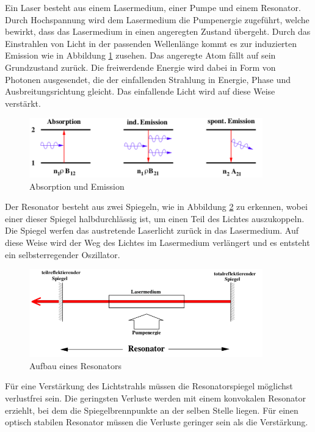 Ein Laser besteht aus einem Lasermedium, einer Pumpe und einem Resonator.
Durch Hochspannung wird dem Lasermedium die Pumpenergie zugeführt, welche bewirkt, dass das Lasermedium in einen angeregten Zustand übergeht.
Durch das Einstrahlen von Licht in der passenden Wellenlänge kommt es zur induzierten Emission wie in Abbildung \ref{fig:absemi} zusehen.
Das angeregte Atom fällt auf sein Grundzustand zurück.
Die freiwerdende Energie wird dabei in Form von Photonen ausgesendet, die der einfallenden Strahlung in Energie, Phase und Ausbreitungsrichtung gleicht.
Das einfallende Licht wird auf diese Weise verstärkt.\\
\begin{figure}[h!]
  \centering
  \includegraphics[width=0.9\textwidth]{absorption.PNG}
  \caption{Absorption und Emission}
  \label{fig:absemi}
\end{figure}
\FloatBarrier
Der Resonator besteht aus zwei Spiegeln, wie in Abbildung \ref{fig:resonator} zu erkennen, wobei einer dieser Spiegel halbdurchlässig ist, um einen Teil des Lichtes auszukoppeln.
Die Spiegel werfen das austretende Laserlicht zurück in das Lasermedium.
Auf diese Weise wird der Weg des Lichtes im Lasermedium verlängert und es entsteht ein selbsterregender Oszillator.
\begin{figure}[h!]
  \centering
  \includegraphics[width=0.9\textwidth]{resonator.PNG}
  \caption{Aufbau eines Resonators}
  \label{fig:resonator}
\end{figure}
\FloatBarrier
Für eine Verstärkung des Lichtstrahls müssen die Resonatorspiegel möglichst verlustfrei sein.
Die geringsten Verluste werden mit einem konvokalen Resonator erziehlt, bei dem die Spiegelbrennpunkte an der selben Stelle liegen.
Für einen optisch stabilen Resonator müssen die Verluste geringer sein als die Verstärkung.
